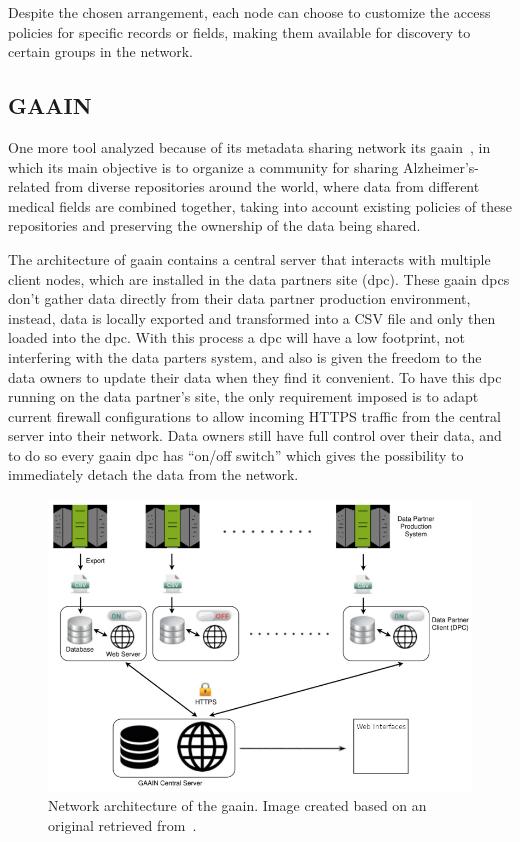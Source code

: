Despite the chosen arrangement, each node can choose to customize the access policies for specific records or fields, making them available for discovery to certain groups in the network.

\subsection*{GAAIN}
One more tool analyzed because of its metadata sharing network its \gls{gaain}~\cite{gaain}, in which its main objective is to organize a community for sharing Alzheimer's-related from diverse repositories around the world, where data from different medical fields are combined together, taking into account existing policies of these repositories and preserving the ownership of the data being shared.

The architecture of \gls{gaain} contains a central server that interacts with multiple client nodes, which are installed in the data partners site (\gls{dpc}).
These \gls{gaain} \gls{dpc}s don't gather data directly from their data partner production environment, instead, data is locally exported and transformed into a CSV file and only then loaded into the \gls{dpc}.
With this process a \gls{dpc} will have a low footprint, not interfering with the data parters system, and also is given the freedom to the data owners to update their data when they find it convenient.
To have this \gls{dpc} running on the data partner's site, the only requirement imposed is to adapt current firewall configurations to allow incoming HTTPS traffic from the central server into their network.
Data owners still have full control over their data, and to do so every \gls{gaain} \gls{dpc} has ``on/off switch'' which gives the possibility to immediately detach the data from the network.

\begin{figure}[H]
    \centering
    \includegraphics[width=.7\linewidth]{gaain.png}
    \caption{Network architecture of the \gls{gaain}. Image created based on an original retrieved from~\cite{gaain}.}
\end{figure}

